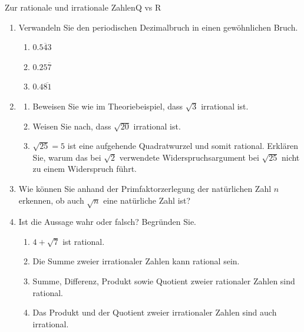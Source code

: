\begin{ueb}
    {Zur rationale und irrationale Zahlen}{Q vs R}
    \begin{enumerate}
        \item
              Verwandeln Sie den periodischen Dezimalbruch in einen gewöhnlichen Bruch.
              \begin{enumerate}
                  \item \(0.\overline{543}\)
                  \item \(0.25\overline{7}\)
                  \item \(0.4\overline{81}\)
              \end{enumerate}


        \item
              \begin{enumerate}
                  \item Beweisen Sie wie im Theoriebeispiel, dass \(\sqrt{3}\) irrational ist.
                  \item Weisen Sie nach, dass \(\sqrt{20}\) irrational ist.
                  \item \(\sqrt{25}=5\) ist eine aufgehende Quadratwurzel und somit rational.
                        Erklären Sie, warum das bei \(\sqrt{2}\) verwendete Widerspruchsargument
                        bei \(\sqrt{25}\) nicht zu einem Widerspruch führt.
              \end{enumerate}

        \item Wie können Sie anhand der Primfaktorzerlegung der natürlichen Zahl \(n\) erkennen, ob auch \(\sqrt{n}\) eine natürliche Zahl ist?


        \item Ist die Aussage wahr oder falsch? Begründen Sie.

              \begin{enumerate}
                  \item \(4+\sqrt{7}\) ist rational.
                  \item Die Summe zweier irrationaler Zahlen kann rational sein.
                  \item Summe, Differenz, Produkt sowie Quotient zweier rationaler Zahlen sind rational.
                  \item Das Produkt und der Quotient zweier irrationaler Zahlen sind auch irrational.
              \end{enumerate}

    \end{enumerate}
\end{ueb}

